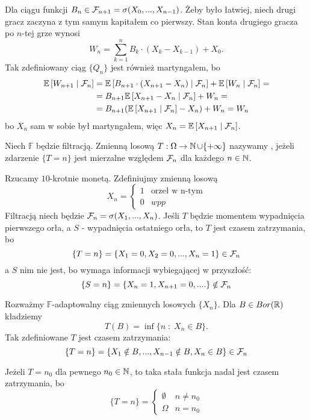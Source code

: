 Dla ciągu funkcji $B_n\in\mathcal{F}_{n+1}=\sigma(X_0,...,X_{n-1})$. Żeby było łatwiej, niech drugi gracz zaczyna z tym samym kapitałem co pierwszy. Stan konta drugiego gracza po $n$-tej grze wynosi 
$$W_n=\sum_{k=1}^nB_k\cdot(X_k-X_{k-1})+X_0.$$
Tak zdefiniowany ciąg $\{Q_n\}$ jest również martyngałem, bo
\begin{align*}
  \expected{W_{n+1}}{\set{F}_n}&=\expected{B_{n+1}\cdot(X_{n+1}-X_n)}{\set{F}_n}+\expected{W_n}{\set{F}_n}=\\
                               &=B_{n+1}\expected{X_{n+1}-X_n}{\set{F}_n}+W_n=\\
                               &=B_{n+1}(\expected{X_{n+1}}{\set{F}_n}-X_n)+W_n=W_n
\end{align*}
bo $X_n$ sam w sobie był martyngałem, więc $X_n=\expected{X_{n+1}}{\set{F}_n}$.

\begin{definition}
  Niech $\mathds{F}$ będzie filtracją. Zmienną losową $T:\Omega\to \operatorname{\mathbb{N}}\cup\{+\infty\}$ nazywamy , jeżeli zdarzenie $\{T=n\}$ jest mierzalne względem $\mathcal{F}_n$ dla każdego $n\in\operatorname{\mathbb{N}}$.
\end{definition}

\begin{example}
\item Rzucamy $10$-krotnie monetą. Zdefiniujmy zmienną losową
  $$X_n=\begin{cases}1&\text{orzeł w n-tym}\\0&wpp\end{cases}$$
  Filtracją niech będzie $\mathcal{F}_n=\sigma(X_1,...,X_n)$. Jeśli $T$ będzie momentem wypadnięcia pierwszego orła, a $S$ - wypadnięcia ostatniego orła, to $T$ jest czasem zatrzymania, bo
  $$\{T=n\}=\{X_1=0,X_2=0,...,X_n=1\}\in\mathcal{F}_n$$
  a $S$ nim nie jest, bo wymaga informacji wybiegającej w przyszłość:
  $$\{S=n\}=\{X_n=1,X_{n+1}=0,....\}\notin\mathcal{F}_n$$
\item Rozważmy $\mathds{F}$-adaptowalny ciąg zmiennych losowych $\{X_n\}$. Dla $B\in Bor(\operatorname{\mathbb{R}})$ kładziemy 
  $$T(B)=\inf\{n\;:\;X_n\in B\}.$$
  Tak zdefiniowane $T$ jest czasem zatrzymania:
  $$\{T=n\}=\{X_1\notin B,...,X_{n-1}\notin B,X_n\in B\}\in\mathcal{F}_n$$
\item Jeżeli $T=n_0$ dla pewnego $n_0\in\operatorname{\mathbb{N}}$, to taka stała funkcja nadal jest czasem zatrzymania, bo
  $$\{T=n\}=\begin{cases}\emptyset&n\neq n_0\\\Omega&n=n_0\end{cases}$$
\end{example}
